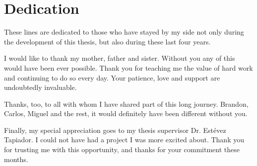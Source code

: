 \documentclass[12pt]{report} %
\begin{document}
	
\chapter*{Dedication}
\thispagestyle{plainnofancy}
\setcounter{page}{5}

	
These lines are dedicated to those who have stayed by my side not only during the development of this thesis, but also during these last four years. 
	
I would like to thank my mother, father and sister. Without you any of this would have been ever possible. Thank you for teaching me the value of hard work and continuing to do so every day. Your patience, love and support are undoubtedly invaluable.

Thanks, too, to all with whom I have shared part of this long journey. Brandon, Carlos, Miguel and the rest, it would definitely have been different without you.

Finally, my special appreciation goes to my thesis supervisor Dr. Estévez Tapiador. I could not have had a project I was more excited about. Thank you for trusting me with this opportunity, and thanks for your commitment these months.

	
	
	\vfill
	
	\newpage
	\thispagestyle{empty}
	\mbox{}
	



\tableofcontents
\clearpage

\newpage
\thispagestyle{empty}
\mbox{}

\listoffigures


\newpage
\thispagestyle{empty}
\mbox{}

\listoftables

\newpage %
\thispagestyle{empty}
\mbox{}

\clearpage
{}
\pagestyle{fancy}

\renewcommand\_{\textunderscore\allowbreak}


















\clearpage
\pagestyle{plainnofancy}

\sloppy
\printbibliography



\end{document}
